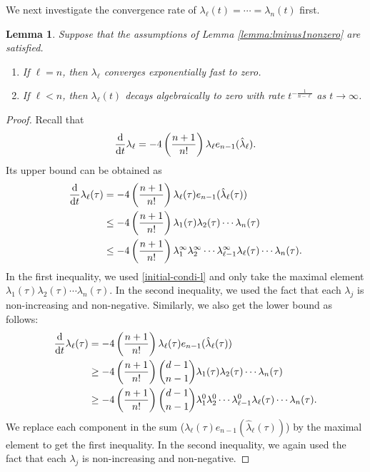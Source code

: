 \documentclass[11pt,reqno]{amsart}
\numberwithin{figure}{section}
\def\d {{\partial}}
\def\d{\mathrm{d}}
\newcommand{\dm}{d}
\renewcommand{\d}{  {\textup{d}} }
\newtheorem{lemma}{Lemma}[section]
\begin{document}
We next investigate the convergence rate of $\lambda_{\ell}(t)=\cdots=\lambda_n(t)$ first.

\begin{lemma}\label{lemma:lambdalrate}
Suppose that the assumptions of Lemma \ref{lemma:lminus1nonzero} are satisfied.

\begin{enumerate}
\item If $\ell=n$, then $\lambda_{\ell}$ converges exponentially fast to zero.

\item If $\ell<n$, then $\lambda_{\ell}(t)$ decays algebraically to zero with rate $t^{-\frac{1}{n-\ell}}$ as $t\to\infty$.
\end{enumerate}
\end{lemma}

\begin{proof}
Recall that
\[
\frac{\d}{\d t}\lambda_{\ell}=-4\left(\frac{n+1}{n!}\right)\lambda_{\ell} e_{n-1}(\hat{\lambda}_{\ell}).
\]
Its upper bound can be obtained as
\begin{align*}
\frac{\d}{\d t}\lambda_{\ell}(\tau)&=-4\left(\frac{n+1}{n!}\right)\lambda_{\ell}(\tau) e_{n-1}(\hat{\lambda}_{\ell}(\tau))\\
&\leq -4\left(\frac{n+1}{n!}\right)\lambda_1(\tau)\lambda_2(\tau)\cdots \lambda_n(\tau)\\
&\leq -4\left(\frac{n+1}{n!}\right)\lambda_1^\infty\lambda_2^\infty\cdots \lambda_{\ell-1}^\infty\lambda_{\ell}(\tau)\cdots\lambda_n(\tau).
\end{align*}
In the first inequality, we used \eqref{initial-condi-l} and only take the maximal element $\lambda_1(\tau)\lambda_2(\tau)\cdots\lambda_n(\tau)$. In the second inequality, we used the fact that each $\lambda_j$ is non-increasing and non-negative. Similarly, we also get the lower bound as follows:
\begin{align*}
\frac{\d}{\d t}\lambda_{\ell}(\tau)&=-4\left(\frac{n+1}{n!}\right)\lambda_{\ell}(\tau) e_{n-1}(\hat{\lambda}_{\ell}(\tau))\\
&\geq -4\left(\frac{n+1}{n!}\right){\dm-1\choose n-1}\lambda_1(\tau)\lambda_2(\tau)\cdots \lambda_n(\tau)\\
&\geq -4\left(\frac{n+1}{n!}\right){\dm-1\choose n-1}\lambda_1^0\lambda_2^0\cdots \lambda_{\ell-1}^0\lambda_{\ell}(\tau)\cdots\lambda_n(\tau).
\end{align*}
We replace each component in the sum ($\lambda_{\ell}(\tau) e_{n-1}(\hat{\lambda}_{\ell}(\tau))$) by the maximal element to get the first inequality. In the second inequality, we again used the fact that each $\lambda_j$ is non-increasing and non-negative.


\end{proof}
\end{document}

